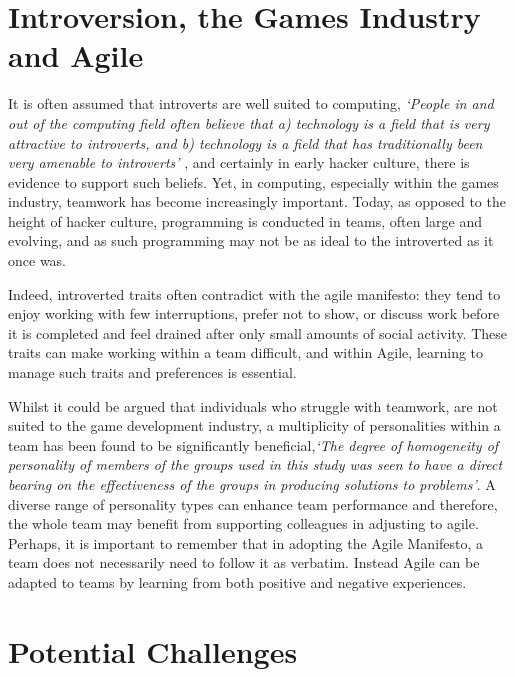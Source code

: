 \documentclass{scrartcl}
\begin{document}
\section{Introversion, the Games Industry and Agile}

It is often assumed that introverts are well suited to computing, \textit{`People in and out of the computing field often believe that a) technology is a field that is very attractive to introverts, and b) technology is a field that has traditionally been very amenable to introverts'} \cite{Kacz}, and certainly in early hacker culture, there is evidence to support such beliefs. Yet, in computing, especially within the games industry, teamwork has become increasingly important. Today, as opposed to the height of hacker culture, programming is conducted in teams, often large and evolving, and as such programming may not be as ideal to the introverted as it once was. 

Indeed, introverted traits often contradict with the agile manifesto: they tend to enjoy working with few interruptions, prefer not to show, or discuss work before it is completed and feel drained after only small amounts of social activity\cite{Cain}.  These traits can make working within a team difficult, and within Agile, learning to manage such traits and preferences is essential.

Whilst it could be argued that individuals who struggle with teamwork, are not suited to the game development industry, a multiplicity of personalities within a team has been found to be significantly beneficial,\textit{`The degree of homogeneity of personality of members of the groups used in this study was seen to have a direct bearing on the effectiveness of the groups in producing solutions to problems'}\cite{Hoffman}. A diverse range of personality types can enhance team performance and therefore, the whole team may benefit from supporting colleagues in adjusting to agile. Perhaps, it is important to remember that in adopting the Agile Manifesto, a team does not necessarily need to follow it as verbatim. Instead Agile can be adapted to teams by learning from both positive and negative experiences. 

\section{Potential Challenges}
\end{document}
